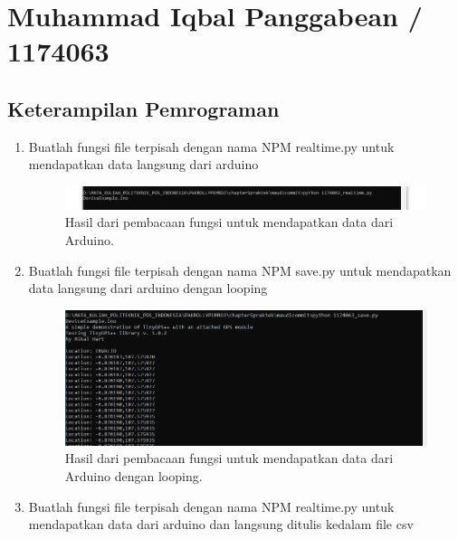\section{Muhammad Iqbal Panggabean / 1174063}
\subsection{Keterampilan Pemrograman}
\begin{enumerate}
	\item Buatlah fungsi file terpisah dengan nama NPM realtime.py untuk mendapatkan data langsung dari arduino
	

	\begin{figure}[H]
		\includegraphics[width=12cm]{figures/chapter5/1174063/1.png}
		\centering
		\caption{Hasil dari pembacaan fungsi untuk mendapatkan data dari Arduino.}
	\end{figure}
	
	\item Buatlah fungsi file terpisah dengan nama NPM save.py untuk mendapatkan data langsung dari arduino dengan looping
	

	\begin{figure}[H]
		\includegraphics[width=12cm]{figures/chapter5/1174063/2.png}
		\centering
		\caption{Hasil dari pembacaan fungsi untuk mendapatkan data dari Arduino dengan looping.}
	\end{figure}
	
	\item Buatlah fungsi file terpisah dengan nama NPM realtime.py untuk mendapatkan data dari arduino dan langsung ditulis kedalam file csv
	


\end{enumerate}
